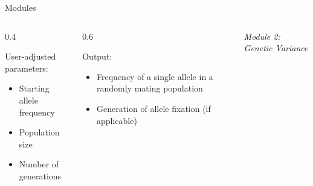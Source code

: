 \documentclass[final]{beamer}
\newlength{\onecolwid}
\newlength{\twocolwid}
\begin{document}
\begin{frame}[t]
\begin{columns}[t]
\begin{column}{\twocolwid}
\begin{block}{Modules}
\begin{columns}[t,totalwidth=\twocolwid]
\begin{column}{\onecolwid}
\vspace{-1cm}

\begin{columns}[t,totalwidth=\onecolwid] %

\begin{column}{0.4\onecolwid} %

User-adjusted parameters:

\begin{itemize}
  \item Starting allele frequency
  \item Population size
  \item Number of generations
\end{itemize}

\end{column}
\begin{column}{0.6\onecolwid} %

Output:

\begin{itemize}
  \item Frequency of a single allele in a randomly mating population
  \item Generation of allele fixation (if applicable)
\end{itemize}


\end{column}
\end{columns}




\end{column} %

\begin{column}{\onecolwid} %




\textit{Module 2: Genetic Variance}

\vspace{0.5cm}

\begin{center}
\begin{figure}
\end{figure}
\end{center}


\end{column}
\end{columns}
\end{block}
\end{column}
\end{columns}
\end{frame}
\end{document}
